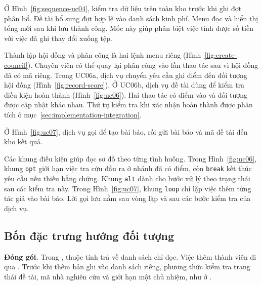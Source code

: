 Ở Hình~\ref{fig:sequence-uc04},  kiểm tra dữ liệu trên toàn kho trước khi ghi đợt phân bổ. Đề tài bổ sung đợt hợp lệ vào danh sách kinh phí. Menu đọc và hiển thị tổng mới sau khi lưu thành công. Mốc này giúp phân biệt việc tính được số tiền với việc đã ghi thay đổi xuống tệp.


Thành lập hội đồng và phân công là hai lệnh menu riêng (Hình~\ref{fig:create-council}). Chuyên viên có thể quay lại phân công vào lần thao tác sau vì hội đồng đã có mã riêng. Trong UC06a, dịch vụ chuyển yêu cầu ghi điểm đến đối tượng hội đồng (Hình~\ref{fig:record-score}). Ở UC06b, dịch vụ đề tài dùng  để kiểm tra điều kiện hoàn thành (Hình~\ref{fig:uc06}). Hai thao tác có điểm vào và đối tượng được cập nhật khác nhau. Thứ tự kiểm tra khi xác nhận hoàn thành được phân tích ở mục~\ref{sec:implementation-integration}.

Ở Hình~\ref{fig:uc07}, dịch vụ gọi  để tạo bài báo, rồi gửi bài báo và mã đề tài đến kho kết quả.

Các khung điều kiện giúp đọc sơ đồ theo từng tình huống. Trong Hình~\ref{fig:uc06}, khung \texttt{opt} giới hạn việc tra cứu đầu ra ở nhánh đã có điểm, còn \texttt{break} kết thúc yêu cầu nếu thiếu bằng chứng. Khung \texttt{alt} dành cho bước xử lý theo trạng thái sau các kiểm tra này. Trong Hình~\ref{fig:uc07}, khung \texttt{loop} chỉ lặp việc thêm từng tác giả vào bài báo. Lời gọi lưu nằm sau vòng lặp và sau các bước kiểm tra của dịch vụ.


\label{sec:oop}
\subsection{Bốn đặc trưng hướng đối tượng}\label{sec:oop-features}

\textbf{Đóng gói.} Trong , thuộc tính  trả về danh sách chỉ đọc. Việc thêm thành viên đi qua . Trước khi thêm bản ghi vào danh sách riêng, phương thức kiểm tra trạng thái đề tài, mã nhà nghiên cứu và giới hạn một chủ nhiệm, như ở .

